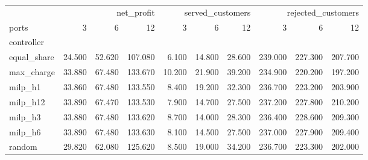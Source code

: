 \begin{tabular}{lrrrrrrrrr}
\toprule
 & \multicolumn{3}{r}{net_profit} & \multicolumn{3}{r}{served_customers} & \multicolumn{3}{r}{rejected_customers} \\
ports & 3 & 6 & 12 & 3 & 6 & 12 & 3 & 6 & 12 \\
controller &  &  &  &  &  &  &  &  &  \\
\midrule
equal_share & 24.500 & 52.620 & 107.080 & 6.100 & 14.800 & 28.600 & 239.000 & 227.300 & 207.700 \\
max_charge & 33.880 & 67.480 & 133.670 & 10.200 & 21.900 & 39.200 & 234.900 & 220.200 & 197.200 \\
milp_h1 & 33.860 & 67.480 & 133.550 & 8.400 & 19.200 & 32.300 & 236.700 & 223.200 & 203.900 \\
milp_h12 & 33.890 & 67.470 & 133.530 & 7.900 & 14.700 & 27.500 & 237.200 & 227.800 & 210.200 \\
milp_h3 & 33.880 & 67.480 & 133.620 & 8.700 & 14.000 & 28.300 & 236.400 & 228.600 & 209.300 \\
milp_h6 & 33.890 & 67.480 & 133.630 & 8.100 & 14.500 & 27.500 & 237.000 & 227.900 & 209.400 \\
random & 29.820 & 62.080 & 125.620 & 8.500 & 19.000 & 34.200 & 236.700 & 223.300 & 202.000 \\
\bottomrule
\end{tabular}

